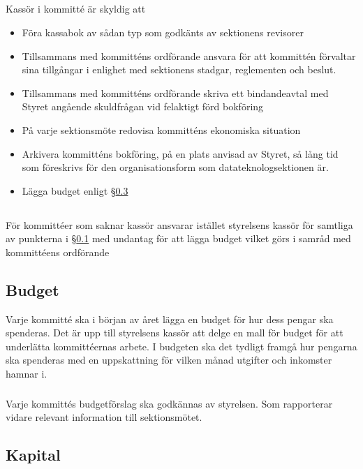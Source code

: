 \documentclass[a4paper, 10pt]{article}
\begin{document}
\subsection{}
\label{sec:kommittee_kassor}
Kassör i kommitté är skyldig att
\begin{itemize}
\item Föra kassabok av sådan typ som godkänts av sektionens revisorer
\item Tillsammans med kommitténs ordförande ansvara för att kommittén förvaltar sina tillgångar i enlighet med sektionens stadgar, reglementen och beslut.
\item Tillsammans med kommitténs ordförande skriva ett bindandeavtal med Styret angående skuldfrågan vid felaktigt förd bokföring
\item På varje sektionsmöte redovisa kommitténs ekonomiska situation
\item Arkivera kommitténs bokföring, på en plats anvisad av Styret, så lång tid som föreskrivs för den organisationsform som datateknologsektionen är.
\item Lägga budget enligt \S\ref{sec:budget}
\end{itemize}
\subsection{}
För kommittéer som saknar kassör ansvarar istället styrelsens kassör för samtliga av punkterna i \S\ref{sec:kommittee_kassor} med undantag för att lägga budget vilket görs i samråd med kommittéens ordförande
\subsection{Budget}
\label{sec:budget}
Varje kommitté ska i början av året lägga en budget för hur dess pengar ska spenderas. Det är upp till styrelsens kassör att delge en mall för budget för att underlätta kommittéernas arbete. I budgeten ska det tydligt framgå hur pengarna ska spenderas med en uppskattning för vilken månad utgifter och inkomster hamnar i.

\subsubsection{}
Varje kommittés budgetförslag ska godkännas av styrelsen. Som rapporterar vidare relevant information till sektionsmötet.


\subsection{Kapital}
\label{sec:sektionsforeningar_startkapital}
\end{document}
